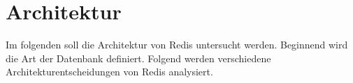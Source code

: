 
\section{Architektur}
Im folgenden soll die Architektur von \acs{Redis} untersucht werden. Beginnend wird die Art der Datenbank definiert. Folgend werden verschiedene Architekturentscheidungen von \acs{Redis} analysiert. 